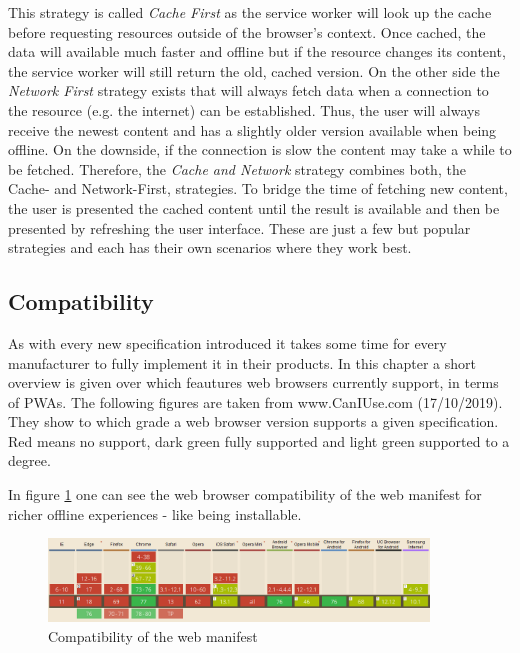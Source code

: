 This strategy is called \textit{Cache First} as the service worker will look up the cache before requesting resources outside of the browser’s context. Once cached, the data will available much faster and offline but if the resource changes its content, the service worker will still return the old, cached version. On the other side the \textit{Network First} strategy exists that will always fetch data when a connection to the resource (e.g. the internet) can be established. Thus, the user will always receive the newest content and has a slightly older version available when being offline. On the downside, if the connection is slow the content may take a while to be fetched. Therefore, the \textit{Cache and Network} strategy combines both, the Cache- and Network-First, strategies. To bridge the time of fetching new content, the user is presented the cached content until the result is available and then be presented by refreshing the user interface. These are just a few but popular strategies and each has their own scenarios where they work best. \cite[pp. 109-111]{hajianProgressiveWebApps2019}

\subsection{Compatibility}
\label{sec:theorieCd}


As with every new specification introduced it takes some time for every manufacturer to fully implement it in their products. In this chapter a short overview is given over which feautures web browsers currently support, in terms of PWAs. The following figures are taken from www.CanIUse.com (17/10/2019). They show to which grade a web browser version supports a given specification. Red means no support, dark green fully supported and light green supported to a degree.

In figure \ref{fig:pwacompatibilitywebmanifest} one can see the web browser compatibility of the web manifest for richer offline experiences - like being installable.

\begin{figure}[htbp] 
	\centering
	\includegraphics[width=0.9\textwidth]{Assets/chapter_pwa/webmanifestsupport.PNG}
	\caption{Compatibility of the web manifest}
	\label{fig:pwacompatibilitywebmanifest}
\end{figure}


